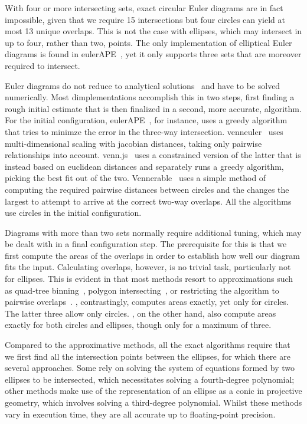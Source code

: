 \documentclass[
  oneside,
  usegeometry,
  numbers=noendperiod,
  openany,
  parskip=half
]{scrbook}\usepackage[]{graphicx}\usepackage{xcolor}
\newcommand{\pkg}[1]{{\fontseries{b}\selectfont #1}}
\begin{document}
With four or more intersecting sets, exact circular Euler diagrams are in fact impossible, given that we require 15 intersections but four circles can yield at most 13 unique overlaps. This is not the case with ellipses, which may intersect in up to four, rather than two, points. The only implementation of elliptical Euler diagrams is found in \pkg{eulerAPE}~\citep{micallef_2014}, yet it only supports three sets that are moreover required to intersect.

Euler diagrams do not reduce to analytical solutions~\citep{chow_2007} and have to be solved numerically. Most dimplementations accomplish this in two steps, first finding a rough initial estimate that is then finalized in a second, more accurate, algorithm. For the initial configuration, \pkg{eulerAPE}~\citep{micallef_2013}, for instance, uses a greedy algorithm that tries to minimze the error in the three-way intersection. \pkg{venneuler}~\citep{wilkinson_2012} uses multi-dimensional scaling with jacobian distances, taking only pairwise relationships into account. \pkg{venn.js}~\citet{frederickson_2016} uses a constrained version of the latter that is instead based on euclidean distances and separately runs a greedy algorithm, picking the best fit out of the two. \pkg{Vennerable}~\citet{swinton_2011} uses a simple method of computing the required pairwise distances between circles and the changes the largest to attempt to arrive at the correct two-way overlaps. All the algorithms use circles in the initial configuration.

Diagrams with more than two sets normally require additional tuning, which may be dealt with in a final configuration step. The prerequisite for this is that we first compute the areas of the overlaps in order to establish how well our diagram fits the input. Calculating overlaps, however, is no trivial task, particularly not for ellipses. This is evident in that most methods resort to approximations such as quad-tree binning~\citep{wilkinson_2012}, polygon intersecting~\citep{kestler_2008}, or restricting the algorithm to pairwise overlaps~\citep{swinton_2011}. \citet{frederickson_2016}, contrastingly, computes areas exactly, yet only for circles. The latter three allow only circles. \citet{micallef_2013}, on the other hand, also compute areas exactly for both circles and ellipses, though only for a maximum of three.

Compared to the approximative methods, all the exact algorithms require that we first find all the intersection points between the ellipses, for which there are several approaches. Some rely on solving the system of equations formed by two ellipses to be intersected, which necessitates solving a fourth-degree polynomial; other methods make use of the representation of an ellipse as a conic in projective geometry, which involves solving a third-degree polynomial. Whilst these methods vary in execution time, they are all accurate up to floating-point precision.
\end{document}
